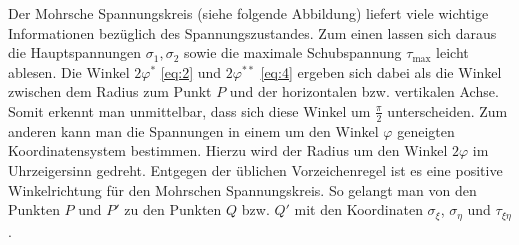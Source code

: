 \documentclass{lecture}
\begin{document}
    \begin{center}
    \end{center}
    Der Mohrsche Spannungskreis (siehe folgende Abbildung) liefert viele wichtige Informationen bezüglich des Spannungszustandes.
    Zum einen lassen sich daraus die Hauptspannungen \(\sigma_1, \sigma_2\) sowie die maximale Schubspannung \(\tau_{\text{max}}\) leicht ablesen.
    Die Winkel \(2\varphi^*\) \eqref{eq:2} und \(2\varphi^{**}\) \eqref{eq:4} ergeben sich dabei als die Winkel zwischen dem Radius zum Punkt \(P\) und der horizontalen bzw. vertikalen Achse.
    Somit erkennt man unmittelbar, dass sich diese Winkel um \(\frac{\pi}{2}\) unterscheiden.
    Zum anderen kann man die Spannungen in einem um den Winkel \(\varphi\) geneigten Koordinatensystem bestimmen.
    Hierzu wird der Radius um den Winkel \(2\varphi\) im Uhrzeigersinn gedreht.
    Entgegen der üblichen Vorzeichenregel ist es eine positive Winkelrichtung für den Mohrschen Spannungskreis.
    So gelangt man von den Punkten \(P\) und \(P'\) zu den Punkten \(Q\) bzw. \(Q'\) mit den Koordinaten \(\sigma_\xi\), \(\sigma_\eta\) und \(\tau_{\xi\eta}\).
\end{document}
